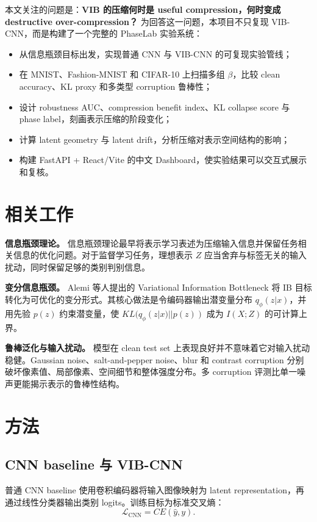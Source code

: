 \documentclass[11pt,a4paper]{article}
\begin{document}
本文关注的问题是：\textbf{VIB 的压缩何时是 useful compression，何时变成 destructive over-compression？} 为回答这一问题，本项目不只复现 VIB-CNN，而是构建了一个完整的 PhaseLab 实验系统：
\begin{itemize}[leftmargin=2em]
    \item 从信息瓶颈目标出发，实现普通 CNN 与 VIB-CNN 的可复现实验管线；
    \item 在 MNIST、Fashion-MNIST 和 CIFAR-10 上扫描多组 $\beta$，比较 clean accuracy、KL proxy 和多类型 corruption 鲁棒性；
    \item 设计 robustness AUC、compression benefit index、KL collapse score 与 phase label，刻画表示压缩的阶段变化；
    \item 计算 latent geometry 与 latent drift，分析压缩对表示空间结构的影响；
    \item 构建 FastAPI + React/Vite 的中文 Dashboard，使实验结果可以交互式展示和复核。
\end{itemize}

\section{相关工作}

\textbf{信息瓶颈理论。} 信息瓶颈理论最早将表示学习表述为压缩输入信息并保留任务相关信息的优化问题。对于监督学习任务，理想表示 $Z$ 应当舍弃与标签无关的输入扰动，同时保留足够的类别判别信息。

\textbf{变分信息瓶颈。} Alemi 等人提出的 Variational Information Bottleneck 将 IB 目标转化为可优化的变分形式。其核心做法是令编码器输出潜变量分布 $q_\phi(z|x)$，并用先验 $p(z)$ 约束潜变量，使 $KL(q_\phi(z|x)||p(z))$ 成为 $I(X;Z)$ 的可计算上界。

\textbf{鲁棒泛化与输入扰动。} 模型在 clean test set 上表现良好并不意味着它对输入扰动稳健。Gaussian noise、salt-and-pepper noise、blur 和 contrast corruption 分别破坏像素值、局部像素、空间细节和整体强度分布。多 corruption 评测比单一噪声更能揭示表示的鲁棒性结构。

\section{方法}

\subsection{CNN baseline 与 VIB-CNN}

普通 CNN baseline 使用卷积编码器将输入图像映射为 latent representation，再通过线性分类器输出类别 logits。训练目标为标准交叉熵：
\begin{equation}
\mathcal{L}_{\text{CNN}}=CE(\hat{y},y).
\end{equation}
\end{document}
